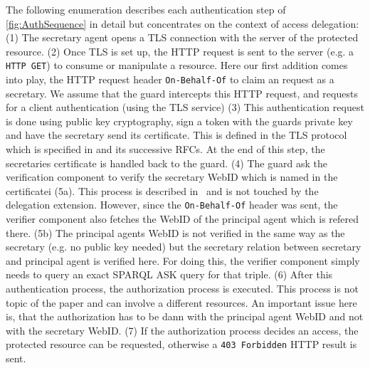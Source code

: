\documentclass[a4paper]{llncs}
\begin{document}
The following enumeration describes each authentication step of \autoref{fig:AuthSequence} in detail but concentrates on the context of access delegation:
(1) The secretary agent opens a TLS connection with the server of the protected resource.
(2) Once TLS is set up, the HTTP request is sent to the server (e.g. a \verb!HTTP GET!) to consume or manipulate a resource.
        Here our first addition comes into play, the HTTP request header \lstinline|On-Behalf-Of| to claim an request as a secretary.
        We assume that the guard intercepts this HTTP request, and requests for a client authentication (using the TLS service)
(3) This authentication request is done using public key cryptography, sign a token with the guards private key and have the secretary send its certificate.
        This is defined in the TLS protocol which is specified in \cite{dierks-t-2012--a} and its successive RFCs.
        At the end of this step, the secretaries certificate is handled back to the guard.
(4) The guard ask the verification component to verify the secretary WebID which is named in the certificatei (5a).
This process is described in~\cite{story-h-2009--a} and is not touched by the delegation extension.
However, since the \lstinline|On-Behalf-Of| header was sent, the verifier component also fetches the WebID of the principal agent which is refered there.
(5b) The principal agents WebID is not verified in the same way as the secretary (e.g. no public key needed) but the secretary relation between secretary and principal agent is verified here.
For doing this, the verifier component simply needs to query an exact SPARQL ASK query for that triple.
(6) After this authentication process, the authorization process is executed.
This process is not topic of the paper and can involve a different resources.
An important issue here is, that the authorization has to be dann with the principal agent WebID and not with the secretary WebID.
(7) If the authorization process decides an access, the protected resource can be requested, otherwise a \lstinline|403 Forbidden| HTTP result is sent.

\end{document}
